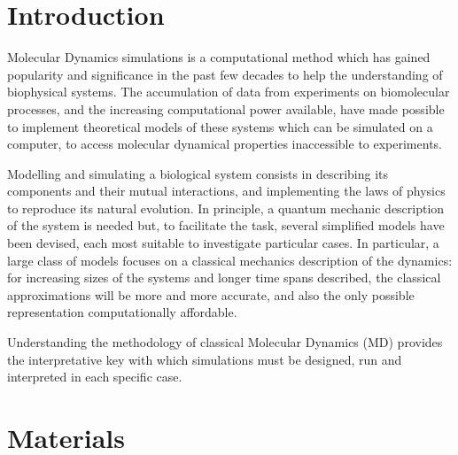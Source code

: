 \section{Introduction}

Molecular Dynamics simulations is a computational method which has gained popularity and significance in the past few decades to help the understanding of biophysical systems.
%
The accumulation of data from experiments on biomolecular processes, and the increasing computational power available, have made possible to implement theoretical models of these systems which can be simulated on a computer, to access molecular dynamical properties inaccessible to experiments.

Modelling and simulating a biological system consists in describing its components and their mutual interactions, and implementing the laws of physics to reproduce its natural evolution. In principle, a quantum mechanic description of the system is needed but, to facilitate the task, several simplified models have been devised, each most suitable to investigate particular cases.
%
In particular, a large class of models focuses on a classical mechanics description of the dynamics: for increasing sizes of the systems and longer time spans described, the classical approximations will be more and more accurate, and also the only possible representation computationally affordable.

Understanding the methodology of classical Molecular Dynamics (MD) provides the interpretative key with which simulations must be designed, run and interpreted in each specific case.


\section{Materials}


